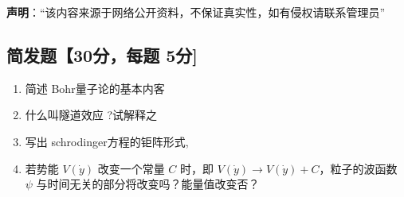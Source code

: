 
\textbf{声明}：“该内容来源于网络公开资料，不保证真实性，如有侵权请联系管理员”

\subsection{简发题【30分，每题 5分]}
\begin{enumerate}
\item 简述 Bohr量子论的基本内客
\item 什么叫隧道效应 ?试解释之
\item 写出 schrodinger方程的钜阵形式,
\item 若势能 $V(\dot{y})$ 改变一个常量 $C$ 时，即 $V(\dot{y}) \rightarrow V(\dot{y}) + C$，粒子的波函数 $\psi$ 与时间无关的部分将改变吗？能量值改变否？
\end{enumerate}
